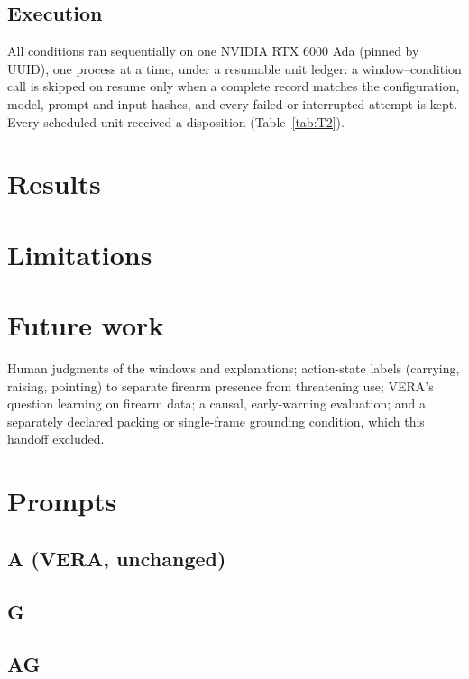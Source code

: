 \documentclass[11pt]{article}
\begin{document}
\subsection{Execution}
All conditions ran sequentially on one NVIDIA RTX 6000 Ada (pinned by UUID), one process at a time, under a resumable unit ledger: a window--condition call is skipped on resume only when a complete record matches the configuration, model, prompt and input hashes, and every failed or interrupted attempt is kept. Every scheduled unit received a disposition (Table~\ref{tab:T2}).

\section{Results}


\section{Limitations}


\section{Future work}
Human judgments of the windows and explanations; action-state labels (carrying, raising, pointing) to separate firearm presence from threatening use; VERA's question learning on firearm data; a causal, early-warning evaluation; and a separately declared packing or single-frame grounding condition, which this handoff excluded.




\appendix
\section{Prompts}\label{app:prompts}
\subsection*{A (VERA, unchanged)}

\subsection*{G}

\subsection*{AG}

\end{document}
